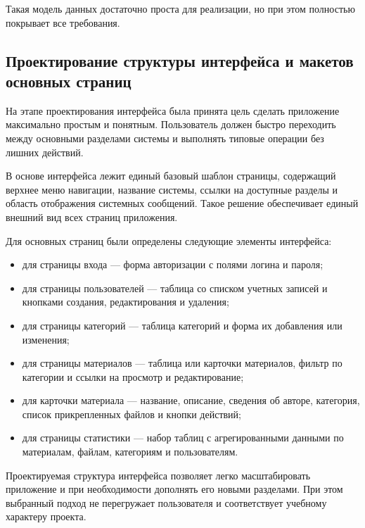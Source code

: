 Такая модель данных достаточно проста для реализации, но при этом полностью покрывает все требования.

\subsection{Проектирование структуры интерфейса и макетов основных страниц}

На этапе проектирования интерфейса была принята цель сделать приложение максимально простым и понятным. Пользователь должен быстро переходить между основными разделами системы и выполнять типовые операции без лишних действий.

В основе интерфейса лежит единый базовый шаблон страницы, содержащий верхнее меню навигации, название системы, ссылки на доступные разделы и область отображения системных сообщений. Такое решение обеспечивает единый внешний вид всех страниц приложения.

Для основных страниц были определены следующие элементы интерфейса:

\begin{itemize}[leftmargin=1.25cm]
    \item для страницы входа --- форма авторизации с полями логина и пароля;
    \item для страницы пользователей --- таблица со списком учетных записей и кнопками создания, редактирования и удаления;
    \item для страницы категорий --- таблица категорий и форма их добавления или изменения;
    \item для страницы материалов --- таблица или карточки материалов, фильтр по категории и ссылки на просмотр и редактирование;
    \item для карточки материала --- название, описание, сведения об авторе, категория, список прикрепленных файлов и кнопки действий;
    \item для страницы статистики --- набор таблиц с агрегированными данными по материалам, файлам, категориям и пользователям.
\end{itemize}

Проектируемая структура интерфейса позволяет легко масштабировать приложение и при необходимости дополнять его новыми разделами. При этом выбранный подход не перегружает пользователя и соответствует учебному характеру проекта.